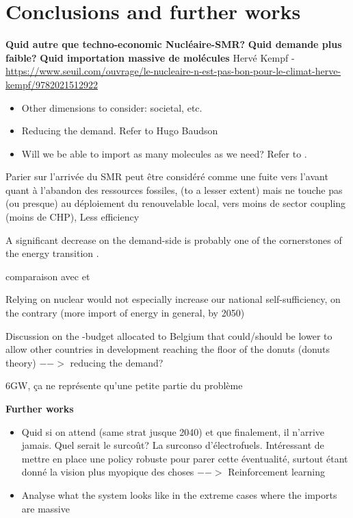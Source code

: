 \documentclass[11pt,twoside,a4paper,english]{article}
\begin{document}

\section{Conclusions and further works}
\label{sec:conclusion}
\textbf{Quid autre que techno-economic Nucléaire-SMR?}
\textbf{Quid demande plus faible?}
\textbf{Quid importation massive de molécules}
Hervé Kempf - \url{https://www.seuil.com/ouvrage/le-nucleaire-n-est-pas-bon-pour-le-climat-herve-kempf/9782021512922}

\begin{itemize}
    \item Other dimensions to consider: societal, etc.
    \item Reducing the demand. Refer to Hugo Baudson \cite{baudson2022impact}
    \item Will we be able to import as many molecules as we need? Refer to \cite{lefebvre2022electrofuel}.
\end{itemize}

Parier sur l'arrivée du \gls{SMR} peut être considéré comme une fuite vers l'avant quant à l'abandon des ressources fossiles, (to a lesser extent) mais ne touche pas (ou presque) au déploiement du renouvelable local, vers moins de sector coupling (moins de CHP), Less efficiency

A significant decrease on the demand-side is probably one of the cornerstones of the energy transition \cite{millward2020providing, contino_sobriety}.

comparaison avec \cite{heuberger2018impact} et \cite{PATHS2050}

Relying on nuclear would not especially increase our national self-sufficiency, on the contrary (more import of energy in general, by 2050)

Discussion on the -budget allocated to Belgium that could/should be lower to allow other countries in development reaching the floor of the donuts (donuts theory) $-->$ reducing the demand?

6GW, ça ne représente qu'une petite partie du problème

\textbf{Further works}
\begin{itemize}
    \item Quid si on attend (same strat jusque 2040) et que finalement, il n'arrive jamais. Quel serait le surcoût? La surconso d'électrofuels. Intéressant de mettre en place une policy robuste pour parer cette éventualité, surtout étant donné la vision plus myopique des choses $-->$ Reinforcement learning
    \item Analyse what the system looks like in the extreme cases where the imports are massive
\end{itemize}
\end{document}
